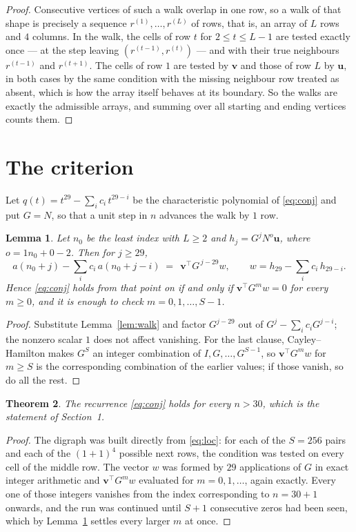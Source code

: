 \documentclass[11pt,a4paper]{article}
\theoremstyle{plain}
\newtheorem{theorem}{Theorem}
\newtheorem{lemma}[theorem]{Lemma}
\theoremstyle{definition}
\begin{document}
\begin{proof}
Consecutive vertices of such a walk overlap in one row, so a walk of that shape is
precisely a sequence $r^{(1)},\dots,r^{(L)}$ of rows, that is, an array of $L$ rows
and $4$ columns. In the walk, the cells of row $t$ for $2\le t\le L-1$ are tested
exactly once --- at the step leaving $(r^{(t-1)},r^{(t)})$ --- and with their true
neighbours $r^{(t-1)}$ and $r^{(t+1)}$. The cells of row $1$ are tested by
$\mathbf{v}$ and those of row $L$ by $\mathbf{u}$, in both cases by the same condition
with the missing neighbour row treated as absent, which is how the array itself behaves at
its boundary. So the walks are exactly the admissible arrays, and summing over all starting
and ending vertices counts them.
\end{proof}

\section{The criterion}

Let $q(t)=t^{29}-\sum_i c_i\,t^{29-i}$ be the characteristic polynomial of
\eqref{eq:conj} and put $G=N$, so that a unit step in $n$ advances the walk by
$1$ row.

\begin{lemma}\label{lem:crit}
Let $n_0$ be the least index with $L\ge2$ and $h_j=G^{j}N^{o}\mathbf{u}$, where
$o=1n_0+0-2$. Then for $j\ge29$,
\[
a(n_0+j)-\sum_i c_i\,a(n_0+j-i)\;=\;\,\mathbf{v}^{\!\top}G^{\,j-29}w,
\qquad w=h_{29}-\sum_i c_i\,h_{29-i} .
\]
Hence \eqref{eq:conj} holds from that point on if and only if
$\mathbf{v}^{\!\top}G^{m}w=0$ for every $m\ge0$, and it is enough to check
$m=0,1,\dots,S-1$.
\end{lemma}

\begin{proof}
Substitute Lemma~\ref{lem:walk} and factor $G^{j-29}$ out of
$G^{j}-\sum_ic_iG^{j-i}$; the nonzero scalar $1$ does not affect
vanishing. For the last clause, Cayley--Hamilton makes $G^{S}$ an integer combination of
$I,G,\dots,G^{S-1}$, so $\mathbf{v}^{\!\top}G^{m}w$ for $m\ge S$ is the corresponding
combination of the earlier values; if those vanish, so do all the rest.
\end{proof}

\begin{theorem}
The recurrence \eqref{eq:conj} holds for every $n>30$, which is the statement of
Section~1.
\end{theorem}

\begin{proof}
The digraph was built directly from \eqref{eq:loc}: for each of the $S=256$ pairs and each
of the $(1+1)^{4}$ possible next rows, the condition was tested on every cell of
the middle row. The vector $w$ was formed by $29$ applications of $G$ in exact integer
arithmetic and $\mathbf{v}^{\!\top}G^{m}w$ evaluated for $m=0,1,\dots$, again exactly.
Every one of those integers vanishes from the index corresponding to $n=30+1$ onwards,
and the run was continued until $S+1$ consecutive zeros had been seen, which by
Lemma~\ref{lem:crit} settles every larger $m$ at once.
\end{proof}
\end{document}
